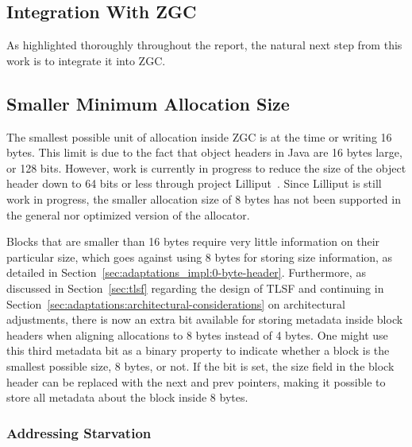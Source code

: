 
\subsection{Integration With ZGC}
\label{sec:future-work:integration}

As highlighted thoroughly throughout the report, the natural next step from this work is to integrate it into ZGC.

\subsection{Smaller Minimum Allocation Size}
\label{sec:future-work:lilliput}

The smallest possible unit of allocation inside ZGC is at the time or writing 16 bytes. This limit is due to the fact that object headers in Java are 16 bytes large, or 128 bits. However, work is currently in progress to reduce the size of the object header down to 64 bits or less through project Lilliput~\cite{lilliput}. Since Lilliput is still work in progress, the smaller allocation size of 8 bytes has not been supported in the general nor optimized version of the allocator.

Blocks that are smaller than 16 bytes require very little information on their particular size, which goes against using 8 bytes for storing size information, as detailed in Section~\ref{sec:adaptations_impl:0-byte-header}. Furthermore, as discussed in Section~\ref{sec:tlsf} regarding the design of TLSF and continuing in Section~\ref{sec:adaptations:architectural-considerations} on architectural adjustments, there is now an extra bit available for storing metadata inside block headers when aligning allocations to 8 bytes instead of 4 bytes. One might use this third metadata bit as a binary property to indicate whether a block is the smallest possible size, 8 bytes, or not. If the bit is set, the size field in the block header can be replaced with the next and prev pointers, making it possible to store all metadata about the block inside 8 bytes.


\subsubsection{Addressing Starvation}
\label{sec:future-work:starvation}

